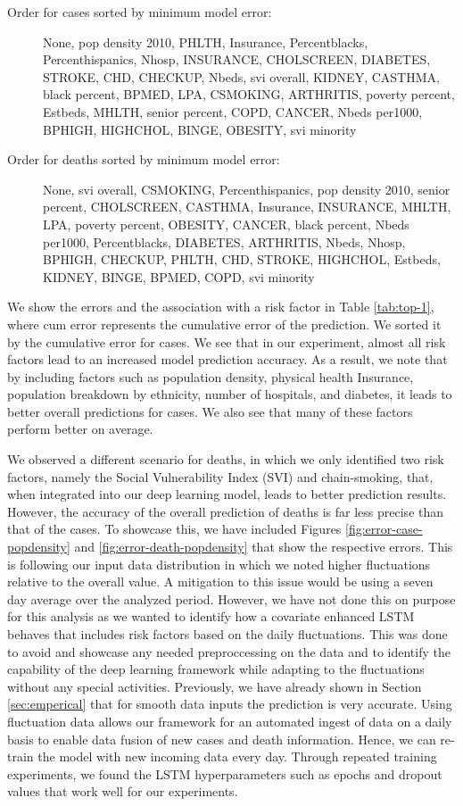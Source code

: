\documentclass[12pt]{article}
\theoremstyle{definition}
\renewcommand{\_}{%
    \textunderscore\hspace{0pt}%
}
\begin{document}
\begin{description}

\item[Order for cases sorted by minimum model error:] None, pop\_density\_2010, PHLTH, Insurance, Percentblacks, Percenthispanics, Nhosp, INSURANCE, CHOLSCREEN, DIABETES, STROKE, CHD, CHECKUP, Nbeds, svi\_overall, KIDNEY, CASTHMA, 
black\_percent, BPMED, LPA, CSMOKING, ARTHRITIS, poverty\_percent, Estbeds, MHLTH, senior\_percent, COPD, CANCER, Nbeds\_per1000, BPHIGH, HIGHCHOL, BINGE, OBESITY, svi\_minority

\item[Order for deaths sorted by minimum model error:]
None, svi\_overall, CSMOKING, Percenthispanics, pop\_density\_2010, senior\_percent, CHOLSCREEN, CASTHMA, Insurance, INSURANCE, MHLTH, LPA, poverty\_percent, OBESITY, CANCER, black\_percent, Nbeds\_per1000, Percentblacks, DIABETES, ARTHRITIS, Nbeds, Nhosp, BPHIGH, CHECKUP, PHLTH, CHD, STROKE, HIGHCHOL, Estbeds, KIDNEY, BINGE, BPMED, COPD, svi\_minority
\end{description}

We show the errors and the association with a risk factor in Table \ref{tab:top-1}, where cum\_error represents the cumulative error of the prediction. We sorted it by the cumulative error for cases. We see that in our experiment, almost all risk factors lead to an increased model prediction accuracy. As a result, we note that by including factors such as population density, physical health Insurance, population breakdown by ethnicity, number of hospitals, and diabetes, it leads to better overall predictions for cases. We also see that many of these factors perform better on average.  

We observed a different scenario for deaths, in which we only identified two risk factors, namely the Social Vulnerability Index (SVI) and chain-smoking, that, when integrated into our deep learning model, leads to better prediction results. However, the accuracy of the overall prediction of deaths is far less precise than that of the cases. To showcase this, we have included Figures \ref{fig:error-case-popdensity} and \ref{fig:error-death-popdensity} that show the respective errors. This is following our input data distribution in which we noted higher fluctuations relative to the overall value. A mitigation to this issue would be using a seven day average over the analyzed period. However, we have not done this on purpose for this analysis as we wanted to identify how a covariate enhanced LSTM behaves that includes risk factors based on the daily fluctuations. This was done to avoid and showcase any needed preproccessing on the data and to identify the capability of the deep learning framework while adapting to the fluctuations without any special activities. Previously, we have already shown in Section \ref{sec:emperical} that for smooth data inputs the prediction is very accurate.
Using fluctuation data allows our framework for an automated ingest of data on a daily basis to enable data fusion of new cases and death information. Hence, we can re-train the model with new incoming data every day. Through repeated training experiments, we found the LSTM hyperparameters such as epochs and dropout values that work well for our experiments.
\end{document}
